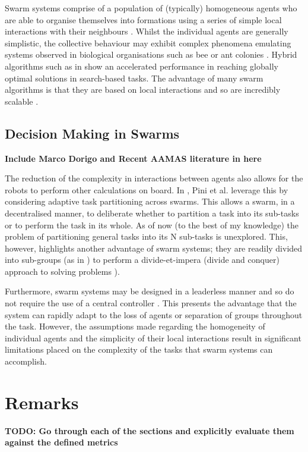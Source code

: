 \documentclass[.../main.tex]{subfiles}
\begin{document}
Swarm systems comprise of a population of (typically) homogeneous agents who are able to organise
themselves
into formations using a series of simple local interactions with their neighbours
\cite{Couceiro2015}. Whilst the individual agents are generally simplistic, the collective behaviour
may exhibit complex phenomena emulating systems observed in biological organisations such as bee or
ant colonies \cite{Sethi2017}. Hybrid algorithms such as in \cite{Gao2018} show an accelerated
performance in reaching globally optimal solutions in search-based tasks. The advantage of many
swarm algorithms is that they are based on local interactions and so are incredibly scalable
\cite{Rizk2018}.

\subsection{Decision Making in Swarms} \label{sec::Decisions_in_Swarms}

\textbf{Include Marco Dorigo and Recent AAMAS literature in here}

The reduction of the complexity in interactions between agents also allows for the robots to perform
other calculations on board. In \cite{Pini2011TaskSelection}, Pini et al. leverage this by
considering adaptive task partitioning across swarms. This allows a swarm, in a decentralised
manner, to deliberate whether to partition a task into its sub-tasks or to perform the task in its
whole. As of now (to the best of my knowledge) the problem of partitioning general tasks into its N
sub-tasks is unexplored. This, however, highlights another advantage of swarm systems; they are
readily divided into sub-groups (as in \cite{Zahadat2016DivisionInhibition}) to perform a
divide-et-impera (divide and conquer) approach to solving problems \cite{Pini2011TaskSelection}). 

Furthermore, swarm systems may be designed in a leaderless manner and so do not require the use of a
central controller \cite{Couceiro2015}. This presents the advantage that the system can rapidly
adapt to the loss of agents or separation of groups throughout the task. However, the assumptions
made regarding the homogeneity of individual agents and the simplicity of their local interactions
result in significant limitations placed on the complexity of the tasks that swarm systems can
accomplish.


\section{Remarks} \label{sec:remarks}

\textbf{TODO: Go through each of the sections and explicitly evaluate them against the defined
metrics}
\end{document}
